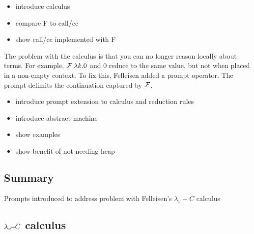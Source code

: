 \documentclass[letterpaper]{llncs}
\begin{document}
\begin{itemize}
	\item introduce calculus
	\item compare F to call/cc
	\item show call/cc implemented with F
\end{itemize}

The problem with the calculus is that you can no longer reason locally about terms. For example, $  \mathcal{F}  \;  \lambda k.0  $ and 0 reduce to the same value, but not when placed in a non-empty context. To fix this, Felleisen added a prompt operator. The prompt delimits the continuation captured by $ \mathcal{F} $.

\begin{itemize}
	\item introduce prompt extension to calculus and reduction rules
	\item introduce abstract machine
	\item show examples
	\item show benefit of not needing heap
\end{itemize}

\subsection*{Summary}

Prompts introduced to address problem with Felleisen's $\lambda_v\!\!-\!\!C$ calculus~\cite{Felleisen1987SyntacticTheory}
	
\subsection*{$ \lambda_v\!\!-\!\!C $ calculus}
\end{document}
